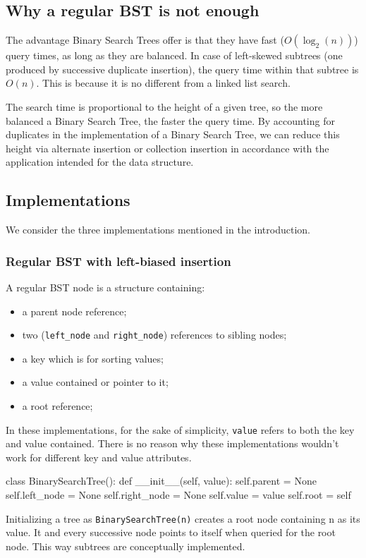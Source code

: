 \documentclass[fleqn,10pt]{SelfArx} %
\begin{document}
\subsection{Why a regular BST is not enough}
The advantage Binary Search Trees offer is that they have fast ($O(\log_2(n))$) query times, as long as they are balanced. In case of left-skewed subtrees (one produced by successive duplicate insertion), the query time within that subtree is $O(n)$. This is because it is no different from a linked list search. 

The search time is proportional to the height of a given tree, so the more balanced a Binary Search Tree, the faster the query time. By accounting for duplicates in the implementation of a Binary Search Tree, we can reduce this height via alternate insertion or collection insertion in accordance with the application intended for the data structure.

\subsection{Implementations}
We consider the three implementations mentioned in the introduction.
\subsubsection{Regular BST with left-biased insertion}
A regular BST node is a structure containing:
\begin{itemize}
 \item a parent node reference;
 \item two (\texttt{left\_node} and \texttt{right\_node}) references to sibling nodes;
 \item a key which is for sorting values;
 \item a value contained or pointer to it;
 \item a root reference;
\end{itemize}
In these implementations, for the sake of simplicity, \texttt{value} refers to both the key and value contained. There is no reason why these implementations wouldn't work for different key and value attributes.
\begin{captioned_code}[title={Python code for BST node structure}]
class BinarySearchTree():
    def __init__(self, value):
        self.parent = None
        self.left_node = None
        self.right_node = None
        self.value = value
        self.root = self
\end{captioned_code}
Initializing a tree as \texttt{BinarySearchTree(n)} creates a root node containing n as its value. It and every successive node points to itself when queried for the root node. This way subtrees are conceptually implemented.
\end{document}
